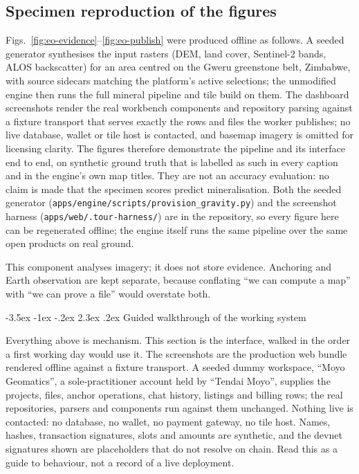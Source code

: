 \documentclass[10pt,a4paper,twocolumn]{article}
\makeatletter
\renewcommand\section{\@startsection{section}{1}{\z@}
  {-3.5ex \@plus -1ex \@minus -.2ex}
  {2.3ex \@plus.2ex}
  {\normalfont\Large\bfseries\hyphenpenalty=10000\exhyphenpenalty=10000}}
\makeatother
\begin{document}
\subsection{Specimen reproduction of the figures}

Figs.~\ref{fig:eo-evidence}--\ref{fig:eo-publish} were produced offline as follows. A seeded
generator synthesises the input rasters (DEM, land cover, Sentinel-2 bands, ALOS
backscatter) for an area centred on the Gweru greenstone belt, Zimbabwe, with source
sidecars matching the platform's active selections; the unmodified engine then runs
the full mineral pipeline and tile build on them. The dashboard screenshots render
the real workbench components and repository parsing against a fixture transport
that serves exactly the rows and files the worker publishes; no live database,
wallet or tile host is contacted, and basemap imagery is omitted for licensing
clarity. The figures therefore demonstrate the pipeline and its interface end to
end, on synthetic ground truth that is labelled as such in every caption and in the
engine's own map titles. They are not an accuracy evaluation: no claim is made that
the specimen scores predict mineralisation. Both the seeded generator
(\texttt{apps/engine/scripts/provision\_gravity.py}) and the screenshot harness
(\texttt{apps/web/.tour-harness/}) are in the repository, so every figure here can be
regenerated offline; the engine itself runs the same pipeline over the same open
products on real ground.

This component analyses imagery; it does not store evidence. Anchoring and Earth
observation are kept separate, because conflating ``we can compute a
map'' with ``we can prove a file'' would overstate both.

\onecolumn
\section{Guided walkthrough of the working system}
\label{sec:tour}

Everything above is mechanism. This section is the interface, walked in the order a
first working day would use it. The screenshots are the production web bundle rendered
offline against a fixture transport. A seeded dummy workspace, ``Moyo Geomatics'', a
sole-practitioner account held by ``Tendai Moyo'', supplies the projects, files, anchor
operations, chat history, listings and billing rows; the real repositories, parsers and
components run against them unchanged. Nothing live is contacted: no database, no
wallet, no payment gateway, no tile host. Names, hashes, transaction signatures, slots
and amounts are synthetic, and the devnet signatures shown are placeholders that do not
resolve on chain. Read this as a guide to behaviour, not a record of a live deployment.
\end{document}
